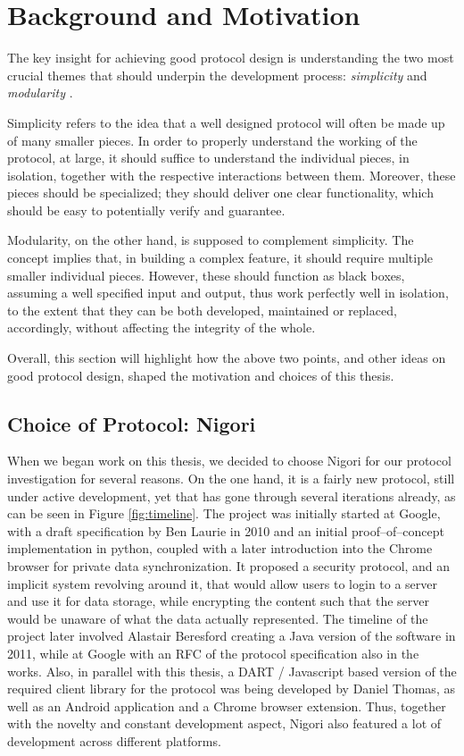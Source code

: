 \chapter{Background and Motivation} \label{chapter:background}
The key insight for achieving good protocol design is understanding the two most crucial themes that should underpin the development process: \textit{simplicity} and \textit{modularity} \cite{ProtocolDesign}.

Simplicity refers to the idea that a well designed protocol will often be made up of many smaller pieces.
In order to properly understand the working of the protocol, at large, it should suffice to understand the individual pieces, in isolation, together with the respective interactions between them.
Moreover, these pieces should be specialized; they should deliver one clear functionality, which should be easy to potentially verify and guarantee.

Modularity, on the other hand, is supposed to complement simplicity. The concept implies that, in building a complex feature, it should require multiple smaller individual pieces.
However, these should function as black boxes, assuming a well specified input and output, thus work perfectly well in isolation, to the extent that they can be both developed, maintained or replaced, accordingly, without affecting the integrity of the whole.

Overall, this section will highlight how the above two points, and other ideas on good protocol design, shaped the motivation and choices of this thesis.

\section{Choice of Protocol: Nigori}
When we began work on this thesis, we decided to choose Nigori for our protocol investigation for several reasons.
On the one hand, it is a fairly new protocol, still under active development, yet that has gone through several iterations already, as can be seen in Figure \ref{fig:timeline}.
The project was initially started at Google, with a draft specification by Ben Laurie in 2010 \cite{NigoriDraft} and an initial proof--of--concept implementation in python, coupled with a later introduction into the Chrome browser for private data synchronization.
It proposed a security protocol, and an implicit system revolving around it, that would allow users to login to a server and use it for data storage, while encrypting the content such that the server would be unaware of what the data actually represented.
The timeline of the project later involved Alastair Beresford creating a Java version of the software in 2011, while at Google with an RFC \cite{NigoriRFC} of the protocol specification also in the works.
Also, in parallel with this thesis, a DART \cite{DART} / Javascript based version of the required client library for the protocol was being developed by Daniel Thomas, as well as an Android application and a Chrome browser extension.
Thus, together with the novelty and constant development aspect, Nigori also featured a lot of development across different platforms.

